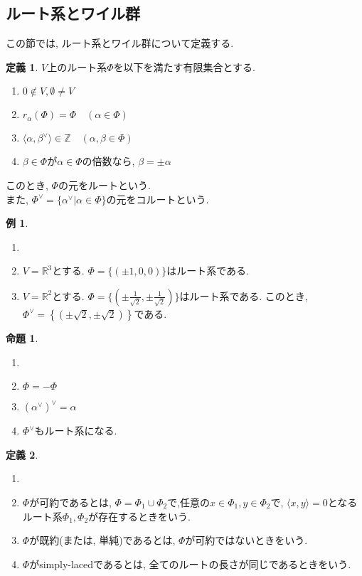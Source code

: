 \documentclass[a4,12pt, titlepage]{jarticle}
\theoremstyle{definition}
\newtheorem{df}{定義}
\newtheorem{prop}[thm]{命題}
\newtheorem*{ex}{例}
\begin{document}
\subsection{ルート系とワイル群}
  この節では, ルート系とワイル群について定義する.
\bigskip

\begin{df} 
  $V$上のルート系$\Phi$を以下を満たす有限集合とする.
  \begin{enumerate}
    \item $ 0 \notin V , \emptyset \neq V $
    \item $ r_\alpha (\Phi) = \Phi \quad ( \alpha \in \Phi )$
    \item $ \langle \alpha, \beta^{ \vee } \rangle \in \mathbb{Z} \quad ( \alpha, \beta \in \Phi )$
    \item $ \beta \in \Phi $が$ \alpha \in \Phi $の倍数なら, $ \beta = \pm \alpha $
  \end{enumerate}
  このとき, $ \Phi $の元をルートという. \\
  また, $ \Phi^{ \vee } = \{ \alpha^{ \vee } | \alpha \in \Phi \} $の元をコルートという.
\end{df}

\begin{ex}
  \begin{enumerate}
    \item[]
    \item $V = \mathbb{R}^3$とする. $\Phi = \{ (\pm1, 0, 0) \}$はルート系である.
    \item $V = \mathbb{R}^2$とする. $\Phi = \{ (\pm \frac{1}{\sqrt{2}}, \pm \frac{1}{\sqrt{2}}) \}$はルート系である.
    このとき, $ \Phi^{\vee} = \left\{ (\pm \sqrt{2}, \pm \sqrt{2})\right\} $である.
  \end{enumerate}
\end{ex}

\begin{prop}
  \begin{enumerate}
    \item[]
    \item $\Phi = - \Phi$
    \item $(\alpha^{\vee})^{ \vee} = \alpha$
    \item $\Phi^{\vee}$もルート系になる.
  \end{enumerate}
\end{prop}

\begin{df}  
  \begin{enumerate} 
    \item[]
    \item $ \Phi $が可約であるとは, $ \Phi = \Phi_1 \cup \Phi_2 $で,任意の$ x \in \Phi_1, y \in \Phi_2 $で,
    $ \langle x, y \rangle = 0 $となるルート系$ \Phi_1, \Phi_2  $が存在するときをいう.
    \item $ \Phi $が既約(または, 単純)であるとは, $ \Phi $が可約ではないときをいう.
    \item $ \Phi $がsimply-lacedであるとは, 全てのルートの長さが同じであるときをいう.
  \end{enumerate} 
\end{df}
\end{document}

